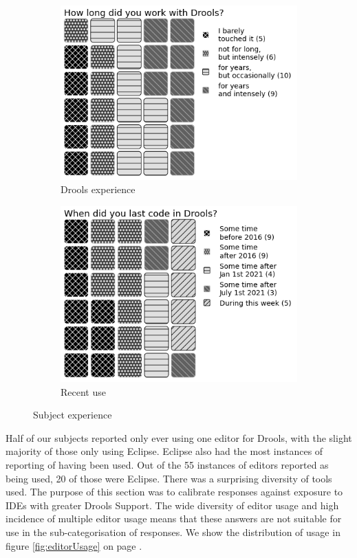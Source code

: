 \begin{figure}
    \begin{subfigure}{.33\textwidth}
      \centering
      \includegraphics[width=.95\linewidth]{Sections/images/pie_droolsExperience4.png}
      \caption{Drools experience}
      \label{fig:sfig2}
    \end{subfigure}
    \begin{subfigure}{.33\textwidth}
        \centering
        \includegraphics[width=.95\linewidth]{Sections/images/pie_recentusage4.png}
        \caption{Recent use}
        \label{fig:sfig3}
      \end{subfigure}
    \caption{Subject experience}
    \label{fig:subject_experience}
\end{figure}

Half of our subjects reported only ever using one editor for Drools, with the slight majority of those only using Eclipse.
Eclipse also had the most instances of reporting of having been used.
Out of the 55 instances of editors reported as being used, 20 of those were Eclipse.
There was a surprising diversity of tools used.
The purpose of this section was to calibrate responses against exposure to IDEs with greater Drools Support.
The wide diversity of editor usage and high incidence of multiple editor usage means that these answers are not suitable for use in the sub-categorisation of responses. 
We show the distribution of usage in figure \ref{fig:editorUsage} on page \pageref{fig:editorUsage}.

